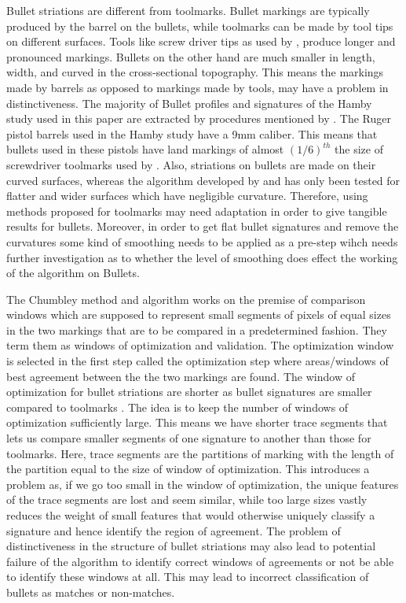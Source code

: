 \documentclass[12pt]{article}
\begin{document}
Bullet striations are different from toolmarks. Bullet markings are
typically produced by the barrel on the bullets, while toolmarks can be
made by tool tips on different surfaces. Tools like screw driver tips as
used by \citet{chumbley}, produce longer and pronounced markings.
Bullets on the other hand are much smaller in length, width, and curved
in the cross-sectional topography. This means the markings made by
barrels as opposed to markings made by tools, may have a problem in
distinctiveness. The majority of Bullet profiles and signatures of the
Hamby study \citep{hamby} used in this paper are extracted by procedures
mentioned by \citet{aoas}. The Ruger pistol barrels used in the Hamby
study have a 9mm caliber. This means that bullets used in these pistols
have land markings of almost \((1/6)^{th}\) the size of screwdriver
toolmarks used by \citet{chumbley}. Also, striations on bullets are made
on their curved surfaces, whereas the algorithm developed by
\citet{chumbley} and \citet{hadler} has only been tested for flatter and
wider surfaces which have negligible curvature. Therefore, using methods
proposed for toolmarks may need adaptation in order to give tangible
results for bullets. Moreover, in order to get flat bullet signatures
and remove the curvatures some kind of smoothing needs to be applied as
a pre-step wihch needs further investigation as to whether the level of
smoothing does effect the working of the algorithm on Bullets.

The Chumbley method and algorithm works on the premise of comparison
windows which are supposed to represent small segments of pixels of
equal sizes in the two markings that are to be compared in a
predetermined fashion. They term them as windows of optimization and
validation. The optimization window is selected in the first step called
the optimization step where areas/windows of best agreement between the
the two markings are found. The window of optimization for bullet
striations are shorter as bullet signatures are smaller compared to
toolmarks . The idea is to keep the number of windows of optimization
sufficiently large. This means we have shorter trace segments that lets
us compare smaller segments of one signature to another than those for
toolmarks. Here, trace segments are the partitions of marking with the
length of the partition equal to the size of window of optimization.
This introduces a problem as, if we go too small in the window of
optimization, the unique features of the trace segments are lost and
seem similar, while too large sizes vastly reduces the weight of small
features that would otherwise uniquely classify a signature and hence
identify the region of agreement. The problem of distinctiveness in the
structure of bullet striations may also lead to potential failure of the
algorithm to identify correct windows of agreements or not be able to
identify these windows at all. This may lead to incorrect classification
of bullets as matches or non-matches.
\end{document}
